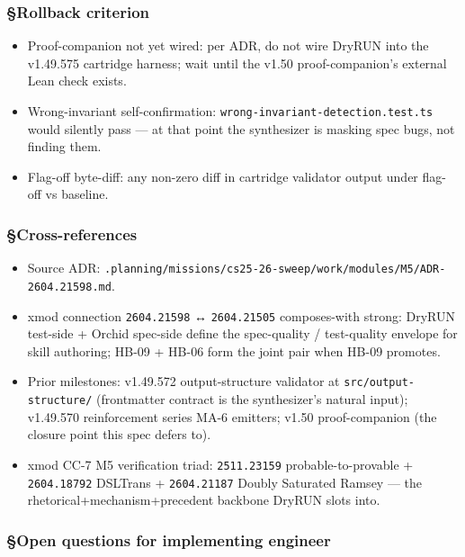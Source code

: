 \documentclass[11pt,letterpaper]{article}
\newcommand{\arxivid}[1]{\texttt{\textcolor{accent}{#1}}}
\providecommand{\tightlist}{\setlength{\itemsep}{0pt}\setlength{\parskip}{0pt}}
\begin{document}
\subsubsection{§Rollback criterion}

\begin{itemize}
\tightlist
\item
  Proof-companion not yet wired: per ADR, do not wire DryRUN into the
  v1.49.575 cartridge harness; wait until the v1.50 proof-companion's
  external Lean check exists.
\item
  Wrong-invariant self-confirmation:
  \texttt{wrong-invariant-detection.test.ts} would silently pass --- at
  that point the synthesizer is masking spec bugs, not finding them.
\item
  Flag-off byte-diff: any non-zero diff in cartridge validator output
  under flag-off vs baseline.
\end{itemize}

\subsubsection{§Cross-references}

\begin{itemize}
\tightlist
\item
  Source ADR:
  \texttt{.planning/missions/cs25-26-sweep/work/modules/M5/ADR-\arxivid{2604.21598}.md}.
\item
  xmod connection \arxivid{2604.21598} ↔ \arxivid{2604.21505}
  composes-with strong: DryRUN test-side + Orchid spec-side define the
  spec-quality / test-quality envelope for skill authoring; HB-09 +
  HB-06 form the joint pair when HB-09 promotes.
\item
  Prior milestones: v1.49.572 output-structure validator at
  \texttt{src/output-structure/} (frontmatter contract is the
  synthesizer's natural input); v1.49.570 reinforcement series MA-6
  emitters; v1.50 proof-companion (the closure point this spec defers
  to).
\item
  xmod CC-7 M5 verification triad: \arxivid{2511.23159}
  probable-to-provable + \arxivid{2604.18792} DSLTrans +
  \arxivid{2604.21187} Doubly Saturated Ramsey --- the
  rhetorical+mechanism+precedent backbone DryRUN slots into.
\end{itemize}

\subsubsection{§Open questions for implementing
engineer}
\end{document}
